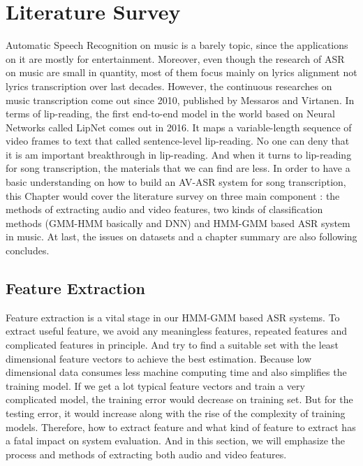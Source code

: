 \chapter{Literature Survey}

Automatic Speech Recognition on music is a barely topic, since the applications on it are mostly for entertainment. Moreover, even though the research of ASR on music are small in quantity, most of them focus mainly on lyrics alignment not lyrics transcription over last decades. However, the continuous researches on music transcription come out since 2010, published by Messaros and Virtanen\cite{Reference5}. 
In terms of lip-reading, the first end-to-end model in the world based on Neural Networks called LipNet\cite{Reference6} comes out in 2016. It maps a variable-length sequence of video frames to text that called sentence-level lip-reading. No one can deny that it is am important breakthrough in lip-reading.
And when it turns to lip-reading for song transcription, the materials that we can find are less. In order to have a basic understanding on how to build an AV-ASR system for song transcription, this Chapter would cover the literature survey on three main component : the methods of extracting audio and video features, two kinds of classification methods (GMM-HMM basically and DNN) and HMM-GMM based ASR system in music. At last, the issues on datasets and a chapter summary are also following concludes.

\section{Feature Extraction }

Feature extraction is a vital stage in our HMM-GMM based ASR systems. To extract useful feature, we avoid any meaningless features, repeated features and complicated features in principle. And try to find a suitable set with the least dimensional feature vectors to achieve the best estimation. Because low dimensional data consumes less machine computing time and also simplifies the training model. If we get a lot typical feature vectors and train a very complicated model, the training error would decrease on training set. But for the testing error, it would increase along with the rise of the complexity of training models. Therefore, how to extract feature and what kind of feature to extract has a fatal impact on system evaluation.
And in this section, we will emphasize the process and methods of extracting both audio and video features.


